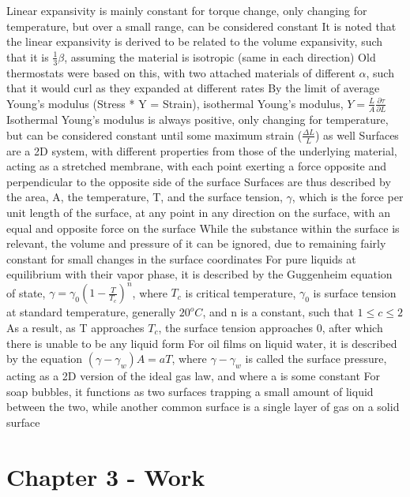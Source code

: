 \documentclass[11 pt, twoside]{article}
\newenvironment{outline*}
{
	\begin{outline}[enumerate]
	}
	{\end{outline}
}
\begin{document}
\begin{outline*}
\4 Linear expansivity is mainly constant for torque change, only changing for temperature, but over a small range, can be considered constant
\4 It is noted that the linear expansivity is derived to be related to the volume expansivity, such that it is $\frac{1}{3}\beta$, assuming the material is isotropic (same in each direction)
\4 Old thermostats were based on this, with two attached materials of different $\alpha$, such that it would curl as they expanded at different rates
\3 By the limit of average Young's modulus (Stress * Y = Strain), isothermal Young's modulus, $Y = \frac{L}{A}\frac{\partial \tau}{\partial L}$
\4 Isothermal Young's modulus is always positive, only changing for temperature, but can be considered constant until some maximum strain ($\frac{\Delta L}{L}$) as well
\1 Surfaces are a 2D system, with different properties from those of the underlying material, acting as a stretched membrane, with each point exerting a force opposite and perpendicular to the opposite side of the surface
\2 Surfaces are thus described by the area, A, the temperature, T, and the surface tension, $\gamma$, which is the force per unit length of the surface, at any point in any direction on the surface, with an equal and opposite force on the surface
\2 While the substance within the surface is relevant, the volume and pressure of it can be ignored, due to remaining fairly constant for small changes in the surface coordinates
\2 For pure liquids at equilibrium with their vapor phase, it is described by the Guggenheim equation of state, $\gamma = \gamma_0(1 - \frac{T}{T_c})^n$, where $T_c$ is critical temperature, $\gamma_0$ is surface tension at standard temperature, generally $20^o C$, and n is a constant, such that $1 \leq c \leq 2$
\3 As a result, as T approaches $T_c$, the surface tension approaches 0, after which there is unable to be any liquid form
\2 For oil films on liquid water, it is described by the equation $(\gamma - \gamma_w)A = aT$, where $\gamma - \gamma_w$ is called the surface pressure, acting as a 2D version of the ideal gas law, and where a is some constant
\2 For soap bubbles, it functions as two surfaces trapping a small amount of liquid between the two, while another common surface is a single layer of gas on a solid surface
\end{outline*}
\section{Chapter 3 - Work}
\end{document}
